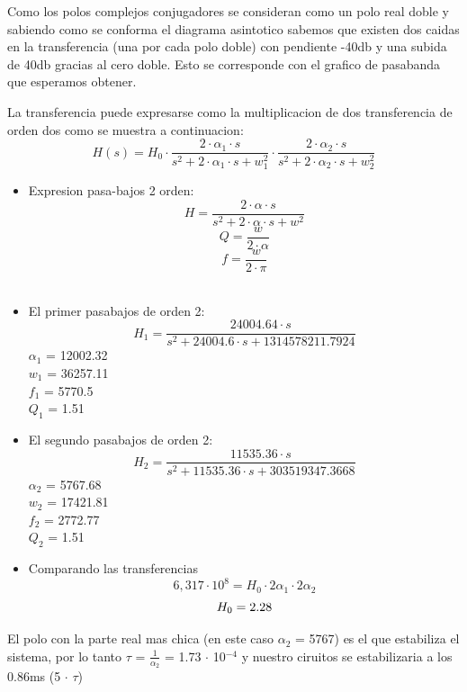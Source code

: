 \documentclass[11pt]{diazessay} %
\begin{document}
Como los polos complejos conjugadores se consideran como un polo real doble y sabiendo como se conforma el diagrama asintotico sabemos que existen
dos caidas en la transferencia (una por cada polo doble) con pendiente -40db y una subida de 40db gracias al cero doble. Esto se corresponde con el
grafico de pasabanda que esperamos obtener.

La transferencia puede expresarse como la multiplicacion de dos transferencia de orden dos como se muestra a continuacion:
\begin{equation}
H(s) = H_{0} \cdot \frac{ 2 \cdot \alpha_{1} \cdot s }{ s^2 + 2 \cdot \alpha_{1} \cdot s + w_{1}^2} \cdot \frac{ 2 \cdot \alpha_{2} \cdot s }{ s^2 + 2 \cdot \alpha_{2} \cdot s + w_{2}^2}
\end{equation}
\begin{itemize}
\item Expresion pasa-bajos 2 orden:
\begin{equation}
H = \frac{ 2 \cdot \alpha \cdot s }{ s^2 + 2 \cdot \alpha \cdot s + w^2}
\end{equation}
\begin{equation}
Q = \frac{w}{2 \cdot \alpha}
\end{equation}
\begin{equation}
f = \frac{w}{2 \cdot \pi}
\end{equation}\\
\item El primer pasabajos de orden 2:
\begin{equation}
H_{1} = \frac{24004.64 \cdot s}{s^2 + 24004.6 \cdot s + 1314578211.7924} 
\end{equation}
$\alpha_{1}$ = 12002.32\\
$w_{1}$ = 36257.11\\
$f_{1}$ = 5770.5\\
$Q_{1}$ = 1.51\\
\item El segundo pasabajos de orden 2:
\begin{equation}
H_{2} = \frac{11535.36 \cdot s}{s^2 +11535.36 \cdot s + 303519347.3668} 
\end{equation}
$\alpha_{2}$ = 5767.68\\
$w_{2}$ = 17421.81\\
$f_{2}$ = 2772.77\\
$Q_{2}$ = 1.51\\
\item Comparando las transferencias
\begin{equation}
6,317 \cdot 10^8 = H_{0} \cdot 2\alpha_{1} \cdot 2\alpha_{2}
\end{equation}
\begin{equation}
H_{0} = 2.28\\
\end{equation}
\end{itemize}
El polo con la parte real mas chica (en este caso $\alpha_{2}$ = 5767) es el que estabiliza el sistema, por lo tanto $\tau$ = $\frac{1}{\alpha_{2}}$ = 1.73 $\cdot$ 10$^{-4}$ y nuestro ciruitos se estabilizaria a los 0.86ms (5 $\cdot$ $\tau$)\\
\end{document}

